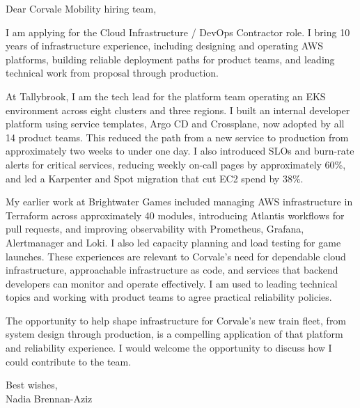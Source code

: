 \documentclass[11pt,a4paper]{article}
\begin{document}
Dear Corvale Mobility hiring team,

I am applying for the Cloud Infrastructure / DevOps Contractor role. I bring 10 years of infrastructure experience, including designing and operating AWS platforms, building reliable deployment paths for product teams, and leading technical work from proposal through production.

At Tallybrook, I am the tech lead for the platform team operating an EKS environment across eight clusters and three regions. I built an internal developer platform using service templates, Argo CD and Crossplane, now adopted by all 14 product teams. This reduced the path from a new service to production from approximately two weeks to under one day. I also introduced SLOs and burn-rate alerts for critical services, reducing weekly on-call pages by approximately 60\%, and led a Karpenter and Spot migration that cut EC2 spend by 38\%.

My earlier work at Brightwater Games included managing AWS infrastructure in Terraform across approximately 40 modules, introducing Atlantis workflows for pull requests, and improving observability with Prometheus, Grafana, Alertmanager and Loki. I also led capacity planning and load testing for game launches. These experiences are relevant to Corvale's need for dependable cloud infrastructure, approachable infrastructure as code, and services that backend developers can monitor and operate effectively. I am used to leading technical topics and working with product teams to agree practical reliability policies.

The opportunity to help shape infrastructure for Corvale's new train fleet, from system design through production, is a compelling application of that platform and reliability experience. I would welcome the opportunity to discuss how I could contribute to the team.

Best wishes,\\
\textcolor[RGB]{0,90,55}{Nadia Brennan-Aziz}
\end{document}
